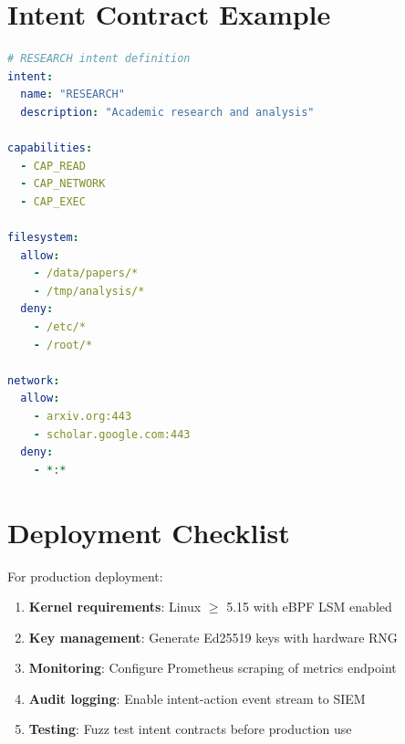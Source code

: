 \documentclass[11pt,a4paper]{article}
\begin{document}
\section{Intent Contract Example}

\begin{lstlisting}[language=yaml]
# RESEARCH intent definition
intent:
  name: "RESEARCH"
  description: "Academic research and analysis"
  
capabilities:
  - CAP_READ
  - CAP_NETWORK
  - CAP_EXEC

filesystem:
  allow:
    - /data/papers/*
    - /tmp/analysis/*
  deny:
    - /etc/*
    - /root/*

network:
  allow:
    - arxiv.org:443
    - scholar.google.com:443
  deny:
    - *:*
\end{lstlisting}

\section{Deployment Checklist}

For production deployment:

\begin{enumerate}
    \item \textbf{Kernel requirements}: Linux $\geq$ 5.15 with eBPF LSM enabled
    \item \textbf{Key management}: Generate Ed25519 keys with hardware RNG
    \item \textbf{Monitoring}: Configure Prometheus scraping of metrics endpoint
    \item \textbf{Audit logging}: Enable intent-action event stream to SIEM
    \item \textbf{Testing}: Fuzz test intent contracts before production use
\end{enumerate}
\end{document}
